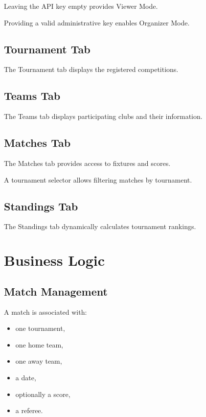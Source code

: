 \documentclass[12pt,a4paper]{article}
\begin{document}
Leaving the API key empty provides Viewer Mode.

Providing a valid administrative key enables Organizer Mode.

\subsection{Tournament Tab}

The Tournament tab displays the registered competitions.

\subsection{Teams Tab}

The Teams tab displays participating clubs and their information.

\subsection{Matches Tab}

The Matches tab provides access to fixtures and scores.

A tournament selector allows filtering matches by tournament.

\subsection{Standings Tab}

The Standings tab dynamically calculates tournament rankings.


\section{Business Logic}

\subsection{Match Management}

A match is associated with:

\begin{itemize}
    \item one tournament,
    \item one home team,
    \item one away team,
    \item a date,
    \item optionally a score,
    \item a referee.
\end{itemize}
\end{document}
